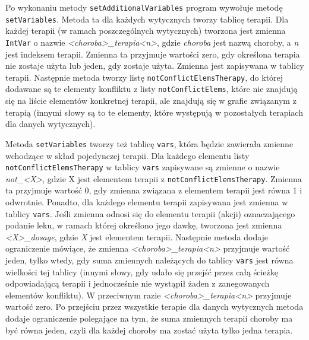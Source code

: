 Po wykonaniu metody \texttt{setAdditionalVariables} program wywołuje metodę \texttt{setVariables}. Metoda ta dla każdych wytycznych tworzy tablicę terapii. Dla każdej terapii (w ramach poszczególnych wytycznych) tworzona jest zmienna \texttt{IntVar} o nazwie \textit{<choroba>\_terapia<n>}, gdzie \textit{choroba} jest nazwą choroby, a \textit{n} jest indeksem terapii. Zmienna ta przyjmuje wartości zero, gdy  określona terapia nie zostaje użyta lub jeden, gdy zostaje użyta. Zmienna jest zapisywana w tablicy terapii. Następnie metoda tworzy listę \texttt{notConflictElemsTherapy}, do której dodawane są te elementy konfliktu z listy \texttt{notConflictElems}, które nie znajdują się na liście elementów konkretnej terapii, ale znajdują się w grafie związanym z terapią (innymi słowy są to te elementy, które występują w pozostałych terapiach dla danych wytycznych). 

Metoda \texttt{setVariables} tworzy też tablicę \texttt{vars}, która będzie zawierała zmienne wchodzące w skład pojedynczej terapii. Dla każdego elementu listy \texttt{notConflictElemsTherapy} w tablicy \texttt{vars} zapisywane są zmienne o nazwie \textit{not\_<X>}, gdzie X jest elementem terapii z \texttt{notConflictElems\-Therapy}. Zmienna ta przyjmuje wartość 0, gdy zmienna związana z elementem terapii jest równa 1 i odwrotnie. Ponadto, dla każdego elementu terapii zapisywana jest zmienna w tablicy \texttt{vars}. Jeśli zmienna odnosi się do elementu terapii (akcji) oznaczającego podanie leku, w ramach której określono jego dawkę, tworzona jest zmienna \textit{<X>\_dosage}, gdzie \textit{X} jest elementem terapii. Następnie metoda dodaje ograniczenie mówiące, że zmienna \textit{<choroba>\_terapia<n>} przyjmuje wartość jeden, tylko wtedy, gdy suma zmiennych należących do tablicy \texttt{vars} jest równa wielkości tej tablicy (innymi słowy, gdy udało się przejść przez całą ścieżkę odpowiadającą terapii i jednocześnie nie wystąpił żaden z zanegowanych elementów konfliktu). W przeciwnym razie \textit{<choroba>\_terapia<n>} przyjmuje wartość zero. Po przejściu przez wszystkie terapie dla danych wytycznych metoda dodaje ograniczenie polegające na tym, że suma zmiennych terapii choroby ma być równa jeden, czyli dla każdej choroby ma zostać użyta tylko jedna terapia. 

